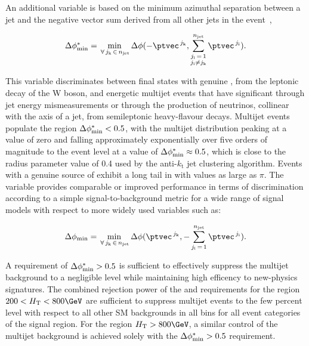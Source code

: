 An additional variable is based on the minimum azimuthal separation
between a jet and the negative vector \ptvec sum derived from all
other jets in the event~\cite{RA1Paper},


\begin{equation}
  \bdphi = \min_{\,\forall\, j_\text{k} \,\in\, \njet}
  \Delta\phi( -\ptvec^{\,j_\text{k}}, 
  \sum_{\substack{j_\text{i}\, =\, 1 \\ j_\text{i} \ne j_\text{k}}}^{\njet}
  \ptvec^{\,j_\text{i}}).   
  \label{eq:bdphi}
\end{equation}

This variable discriminates between final states with genuine
\ptvecmiss, \eg from the leptonic decay of the W boson, and energetic
multijet events that have significant \ptvecmiss through jet energy
mismeasurements or through the production of neutrinos, collinear with
the axis of a jet, from semileptonic heavy-flavour decays. Multijet
events populate the region $\bdphi < 0.5$, with the multijet
distribution peaking at a value of zero and falling approximately
exponentially over five orders of magnitude to the event level at a
value of $\bdphi \approx 0.5$, which is close to the radius parameter
value of 0.4 used by the anti-$k_\text{t}$ jet clustering
algorithm. Events with a genuine source of \ptvecmiss exhibit a long
tail in \bdphi with values as large as $\pi$. The \bdphi variable
provides comparable or improved performance in terms of discrimination
according to a simple signal-to-background metric for a wide range of
signal models with respect to more widely used variables such as:

\begin{equation}
  \Delta\phi_\text{min} = \min_{\,\forall\, j_\text{k} \,\in\, \njet}
  \Delta\phi(\ptvec^{\,j_\text{k}}, -\sum_{j_\text{i}\, =\, 1}^{\njet}
  \ptvec^{\,j_\text{i}}).
  \label{eq:dphi}
\end{equation}


A requirement of $\bdphi > 0.5$ is sufficient to effectively suppress
the multijet background to a negligible level while maintaining high
efficency to new-physics signatures. The combined rejection power of
the \alphat and \bdphi requirements for the region $200 < \scalht <
800\GeV$ are sufficient to suppress multijet events to the few percent
level with respect to all other SM backgrounds in all \scalht bins for
all event categories of the signal region. For the region $\scalht >
800\GeV$, a similar control of the multijet background is achieved
solely with the $\bdphi > 0.5$ requirement.

